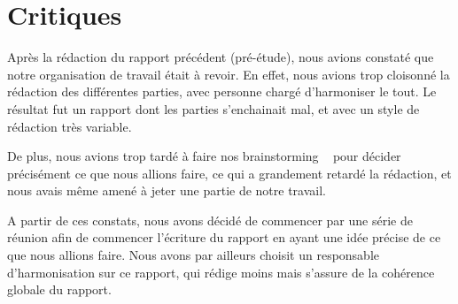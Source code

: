 \section{Critiques}
	Après la rédaction du rapport précédent (pré-étude), nous avions constaté que notre organisation de travail était à revoir. 
	En effet, nous avions trop cloisonné la rédaction des différentes parties, avec personne chargé d'harmoniser le tout.
	Le résultat fut un rapport dont les parties s'enchainait mal, et avec un style de rédaction très variable.

	De plus, nous avions trop tardé à faire nos \og brainstorming \fg~ pour décider précisément ce que nous allions faire, ce qui a grandement retardé la rédaction, et nous avais même amené à jeter une partie de notre travail.

	A partir de ces constats, nous avons décidé de commencer par une série de réunion afin de commencer l'écriture du rapport en ayant une idée précise de ce que nous allions faire.
	Nous avons par ailleurs choisit un responsable d'harmonisation sur ce rapport, qui rédige moins mais s'assure de la cohérence globale du rapport.